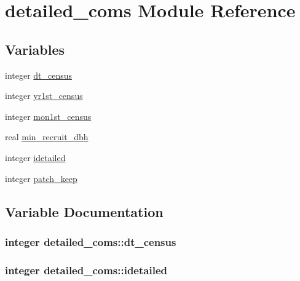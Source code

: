 \hypertarget{namespacedetailed__coms}{}\section{detailed\+\_\+coms Module Reference}
\label{namespacedetailed__coms}
\subsection*{Variables}
\begin{DoxyCompactItemize}
\item 
integer \hyperlink{namespacedetailed__coms_a5d3b59a9d43ec5865a4be92ffdde1982}{dt\+\_\+census}
\item 
integer \hyperlink{namespacedetailed__coms_ad52c2a6c02170c71e22316df2c842b91}{yr1st\+\_\+census}
\item 
integer \hyperlink{namespacedetailed__coms_a7101fa67abae725580d0c44df3fd9845}{mon1st\+\_\+census}
\item 
real \hyperlink{namespacedetailed__coms_af27afe5cb99befa2f9c910987d214757}{min\+\_\+recruit\+\_\+dbh}
\item 
integer \hyperlink{namespacedetailed__coms_a600c197b688f861519c7fc669706c166}{idetailed}
\item 
integer \hyperlink{namespacedetailed__coms_a6541b50f2722b8a83448571dc25934aa}{patch\+\_\+keep}
\end{DoxyCompactItemize}


\subsection{Variable Documentation}
\subsubsection[{\texorpdfstring{dt\+\_\+census}{dt_census}}]{\setlength{\rightskip}{0pt plus 5cm}integer detailed\+\_\+coms\+::dt\+\_\+census}\hypertarget{namespacedetailed__coms_a5d3b59a9d43ec5865a4be92ffdde1982}{}\label{namespacedetailed__coms_a5d3b59a9d43ec5865a4be92ffdde1982}
\subsubsection[{\texorpdfstring{idetailed}{idetailed}}]{\setlength{\rightskip}{0pt plus 5cm}integer detailed\+\_\+coms\+::idetailed}\hypertarget{namespacedetailed__coms_a600c197b688f861519c7fc669706c166}{}\label{namespacedetailed__coms_a600c197b688f861519c7fc669706c166}
